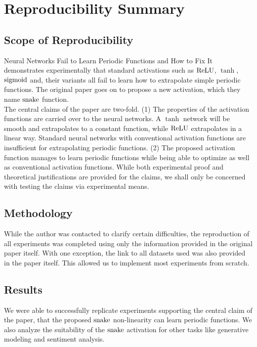 \section*{\centering Reproducibility Summary}

\subsection*{Scope of Reproducibility}

Neural Networks Fail to Learn Periodic Functions and How to Fix It \cite{ziyin2020neural} demonstrates experimentally that standard activations such as \( \operatorname{ReLU} \), \( \tanh \), \( \operatorname{sigmoid} \) and, their variants all fail to learn how to extrapolate simple periodic functions. The original paper goes on to propose a new activation, which they name $\operatorname{snake}$ function. \\
 
The central claims of the paper are two-fold. (1) The properties of the activation functions are carried over to the neural networks. A \( \tanh \) network will be smooth and extrapolates to a constant function, while \( \operatorname{ReLU} \) extrapolates in a linear way. Standard neural networks with conventional activation functions are insufficient for extrapolating periodic functions. (2) The proposed activation function manages to learn periodic functions while being able to optimize as well as conventional activation functions. While both experimental proof and theoretical justifications are provided for the claims, we shall only be concerned with testing the claims via experimental means.

\subsection*{Methodology}

While the author was contacted to clarify certain difficulties, the reproduction of all experiments was completed using only the information provided in the original paper itself.
With one exception, the link to all datasets used was also provided in the paper itself. This allowed us to implement most experiments from scratch.

\subsection*{Results}


We were able to successfully replicate experiments supporting the central claim of the paper, that the proposed \( \operatorname{snake} \) non-linearity can learn periodic functions. We also analyze the suitability of the \( \operatorname{snake} \) activation for other tasks like generative modeling and sentiment analysis.


